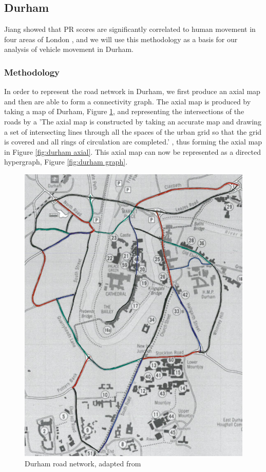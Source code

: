 \documentclass[11pt]{report}
\begin{document}
{\subsection{Durham} \label{sec:durham}
Jiang showed that PR scores are significantly correlated to human movement in four areas of London \cite{doi:10.1080/13658810802022822}, and we will use this methodology as a basis for our analysis of vehicle movement in Durham. 
\subsubsection{Methodology}
In order to represent the road network in Durham, we first produce an axial map and then are able to form a connectivity graph. The axial map is produced by taking a map of Durham, Figure \ref{fig:durham map}, and representing the intersections of the roads by a 'The axial map is constructed by taking an accurate map and drawing a set of intersecting lines through all the spaces of the urban grid so that the grid is covered and all rings of circulation are completed.' \cite{Axialmap40:online}, thus forming the axial map in Figure \ref{fig:durham axial}. This axial map can now be represented as a directed hypergraph, Figure \ref{fig:durham graph}. 

\begin{figure}[h]
\centering
\includegraphics[width=\linewidth]{durham_with_colour.jpg}
\caption{Durham road network, adapted from \cite{undergraduate}}
\label{fig:durham map}
\end{figure}

}
\end{document}
